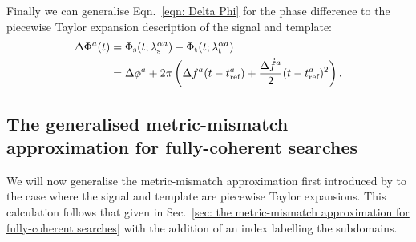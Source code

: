 \documentclass[../full_thesis/full_thesis.tex]{subfiles}
\begin{document}
Finally we can generalise Eqn.~\eqref{eqn: Delta Phi} for the phase difference
to the piecewise Taylor expansion description of the signal and template:
\begin{align}
\begin{split}
\Delta\Phi^{a}(t)& =  \Phi_{\textrm{s}}(t; {\lambda}_\textrm{s}^{\alpha a}) - \Phi_{\textrm{t}}(t; {\lambda}_\textrm{t}^{\alpha a})\\
& = \Delta\phi^{a} + 2\pi\left(\Delta f^{a}(t-t_{\textrm{ref}}^{a})
+ \frac{\Delta\dot{f}^{a}}{2}(t - t_{\textrm{ref}}^{a})^{2}\right).
\end{split}
\end{align}

\subsection{The generalised metric-mismatch approximation for fully-coherent
            searches}

We will now generalise the metric-mismatch approximation first introduced by
\citet{Brady1998} to the case where the signal and template are piecewise
Taylor expansions. This calculation follows that given in Sec.~\ref{sec: the
metric-mismatch approximation for fully-coherent searches} with the addition
of an index labelling the subdomains.
\end{document}
